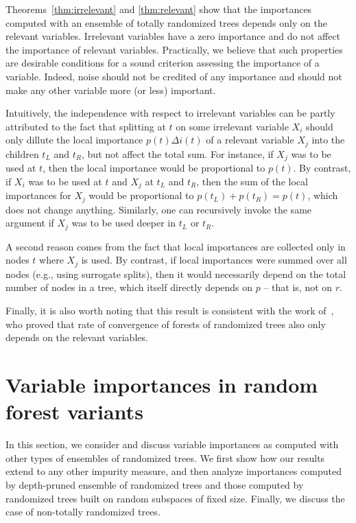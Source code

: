 Theorems~\ref{thm:irrelevant} and \ref{thm:relevant} show that the
importances computed with an ensemble of totally randomized trees depends only
on the relevant variables. Irrelevant variables have a zero importance and do
not affect the importance of relevant variables. Practically, we believe that
such properties are desirable conditions for a sound criterion assessing the
importance of a variable. Indeed, noise should not be credited of any importance
and should not make any other variable more (or less) important.

Intuitively, the independence with respect to irrelevant variables can be partly
attributed to the fact that splitting at $t$ on some irrelevant variable $X_i$
should only dillute the local importance $p(t) \Delta i(t)$ of a relevant
variable $X_j$ into the children $t_L$ and $t_R$, but not affect the total sum.
For instance, if $X_j$ was to be used at $t$, then the local importance would be
proportional to $p(t)$. By contrast, if $X_i$ was to be used at $t$ and $X_j$ at
$t_L$ and $t_R$, then the sum of the local importances for $X_j$ would be
proportional to $p(t_L) + p(t_R)=p(t)$, which does not change anything.
Similarly, one can recursively invoke the same argument if $X_j$ was to be used
deeper in $t_L$ or $t_R$.

A second reason comes from the
fact that local importances are collected only in nodes $t$ where $X_j$ is used.
By contrast, if local importances were summed over all nodes (e.g., using
surrogate splits), then it would necessarily depend on the total number of nodes
in a tree, which itself directly depends on $p$ -- that is, not on $r$.

Finally, it is also worth noting that this result is consistent with the work
of~\citet{biau:2012}, who proved that rate of convergence of forests
of randomized trees also only depends on the relevant variables.


\section{Variable importances in random forest variants}
\label{sec:6:variants}

In this section, we consider and discuss variable importances as computed with
other types of ensembles of randomized trees. We first show how our results
extend to any other impurity measure, and then analyze importances computed by
depth-pruned ensemble of randomized trees and those computed by randomized
trees built on random subspaces of fixed size. Finally, we discuss the case of
non-totally randomized trees.

